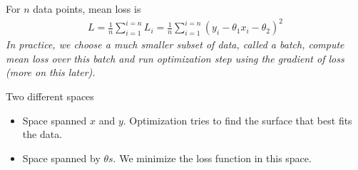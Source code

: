 \begin{frame}%
	For $n$ data points, mean  loss is 
	\begin{align*}
		L = \frac{1}{n} \sum_{i=1}^{i=n}L_i  
		  = \frac{1}{n} \sum_{i=1}^{i=n} (y_i-\theta_1 x_i-\theta_2)^2
	\end{align*}
	{\it In practice, we choose a much smaller subset of data, called a batch, compute 
	mean loss over this batch and run  optimization step using the gradient of loss 
	(more on this later).} 
	\begin{block}{Two different spaces}
		\begin{itemize}
			\item Space spanned $x$ and $y$. Optimization tries to find the surface that best 
			fits the data. 
			\item Space spanned by $\theta s$. We minimize the loss function in this space.  
		\end{itemize}
	\end{block}
\end{frame}


